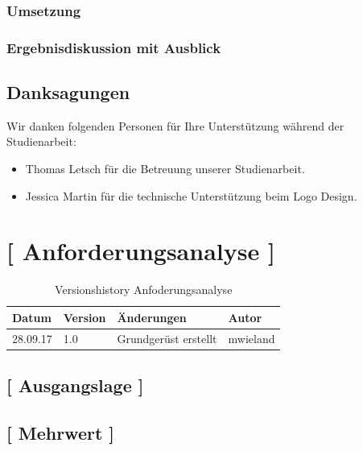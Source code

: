 \documentclass[11pt,a4paper,english,oneside]{book}
\numberwithin{equation}{chapter}
\begin{document}
	\subsection*{Umsetzung}
	
	\subsection*{Ergebnisdiskussion mit Ausblick}
	
	\newpage
	
	\section*{Danksagungen}
	\thispagestyle{firststyle}
	
	Wir danken folgenden Personen für Ihre Unterstützung während der Studienarbeit:
	
	\begin{itemize}
		\item Thomas Letsch für die Betreuung unserer Studienarbeit.
		\item Jessica Martin für die technische Unterstützung beim Logo Design.
	\end{itemize}
	
	\tableofcontents
	
	\newpage
	\chapter{[ Anforderungsanalyse ]}
	
	\begin{table}[h!]
		\centering
		\begin{tabularx}{\linewidth}{X X X X}
			\toprule 
			Datum & Version & Änderungen & Autor \\
			\midrule
			28.09.17 & 1.0 & Grundgerüst erstellt & mwieland \\
			\bottomrule 
		\end{tabularx} 
		\caption{Versionshistory Anfoderungsanalyse} 
	\end{table}
	
	\section{[ Ausgangslage ]}
	
	\section{[ Mehrwert ]}
	
\end{document}
